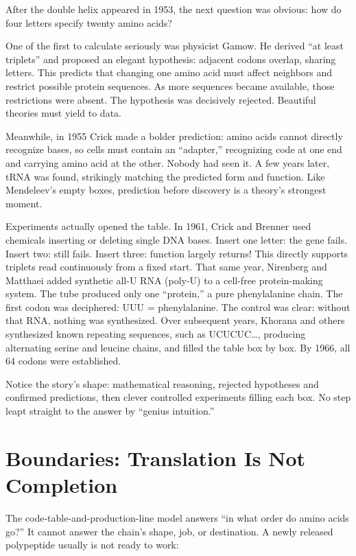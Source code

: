 \begin{zhengju}
After the double helix appeared in 1953, the next question was obvious: how do four letters specify twenty amino acids?

One of the first to calculate seriously was physicist Gamow. He derived ``at least triplets'' and proposed an elegant hypothesis: adjacent codons overlap, sharing letters. This predicts that changing one amino acid must affect neighbors and restrict possible protein sequences. As more sequences became available, those restrictions were absent. The hypothesis was decisively rejected. Beautiful theories must yield to data.

Meanwhile, in 1955 Crick made a bolder prediction: amino acids cannot directly recognize bases, so cells must contain an ``adapter,'' recognizing code at one end and carrying amino acid at the other. Nobody had seen it. A few years later, tRNA was found, strikingly matching the predicted form and function. Like Mendeleev's empty boxes, prediction before discovery is a theory's strongest moment.

Experiments actually opened the table. In 1961, Crick and Brenner used chemicals inserting or deleting single DNA bases. Insert one letter: the gene fails. Insert two: still fails. Insert three: function largely returns! This directly supports triplets read continuously from a fixed start. That same year, Nirenberg and Matthaei added synthetic all-U RNA (poly-U) to a cell-free protein-making system. The tube produced only one ``protein,'' a pure phenylalanine chain. The first codon was deciphered: UUU = phenylalanine. The control was clear: without that RNA, nothing was synthesized. Over subsequent years, Khorana and others synthesized known repeating sequences, such as UCUCUC…, producing alternating serine and leucine chains, and filled the table box by box. By 1966, all 64 codons were established.

Notice the story's shape: mathematical reasoning, rejected hypotheses and confirmed predictions, then clever controlled experiments filling each box. No step leapt straight to the answer by ``genius intuition.''
\end{zhengju}

\section{Boundaries: Translation Is Not Completion}

The code-table-and-production-line model answers ``in what order do amino acids go?'' It cannot answer the chain's shape, job, or destination. A newly released polypeptide usually is not ready to work:

